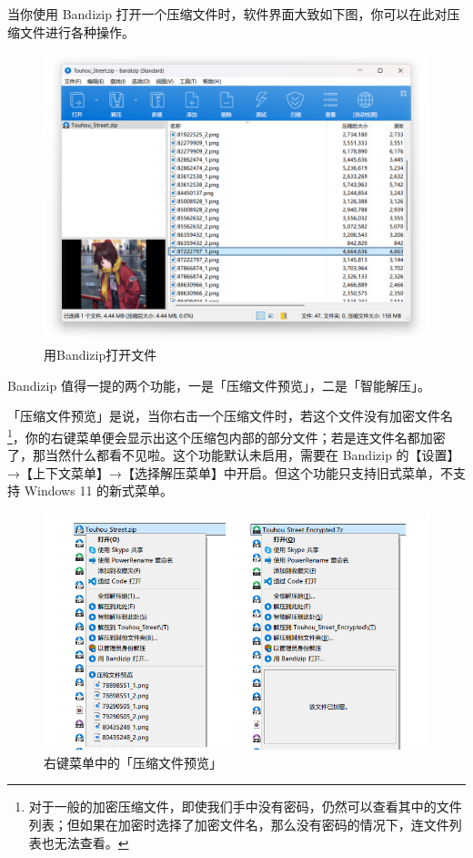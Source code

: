 {当你使用 Bandizip 打开一个压缩文件时，软件界面大致如下图，你可以在此对压缩文件进行各种操作。

\begin{figure}[htb!]
  \centering
  \includegraphics[width=.65\textwidth]{assets/software/Bandizip_opening_archive.png}
  \caption{用Bandizip打开文件}
  \label{fig:Bandizip_opening_archive}
\end{figure}

Bandizip 值得一提的两个功能，一是「压缩文件预览」，二是「智能解压」。

「压缩文件预览」是说，当你右击一个压缩文件时，若这个文件没有加密文件名\footnote{对于一般的加密压缩文件，即使我们手中没有密码，仍然可以查看其中的文件列表；但如果在加密时选择了加密文件名，那么没有密码的情况下，连文件列表也无法查看。}，你的右键菜单便会显示出这个压缩包内部的部分文件；若是连文件名都加密了，那当然什么都看不见啦。这个功能默认未启用，需要在 Bandizip 的【设置】→【上下文菜单】→【选择解压菜单】中开启。但这个功能只支持旧式菜单，不支持 Windows 11 的新式菜单。

\begin{figure}[htb!]
  \centering
  \includegraphics[width=.75\textwidth]{assets/software/Compressed_Preview.png}
  \caption{右键菜单中的「压缩文件预览」}
  \label{fig:Compressed_Preview}
\end{figure}

}
